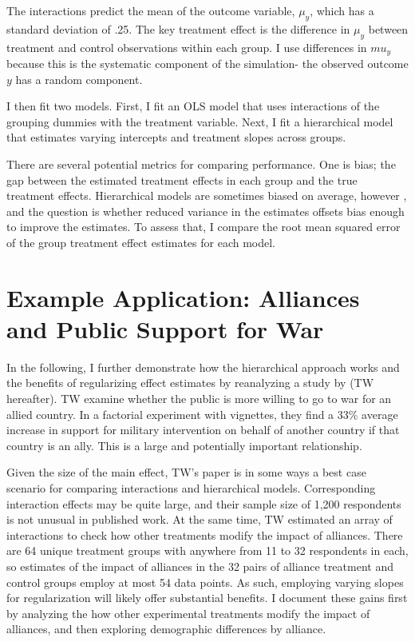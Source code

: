 \documentclass[12pt]{article}
\begin{document}
The interactions predict the mean of the outcome variable, $\mu_y$, which has a standard deviation of .25. 
The key treatment effect is the difference in $\mu_y$ between treatment and control observations within each group. 
I use differences in $mu_y$ because this is the systematic component of the simulation- the observed outcome $y$ has a random component. 


I then fit two models. 
First, I fit an OLS model that uses interactions of the grouping dummies with the treatment variable.
Next, I fit a hierarchical model that estimates varying intercepts and treatment slopes across groups.


There are several potential metrics for comparing performance. 
One is bias; the gap between the estimated treatment effects in each group and the true treatment effects. 
Hierarchical models are sometimes biased on average, however \citep{CliffordRainey2024}, and the question is whether reduced variance in the estimates offsets bias enough to improve the estimates.
To assess that, I compare the root mean squared error of the group treatment effect estimates for each model. 




\section{Example Application: Alliances and Public Support for War} 


In the following, I further demonstrate how the hierarchical approach works and the benefits of regularizing effect estimates by reanalyzing a study by \citet{TomzWeeks2021} (TW hereafter). 
TW examine whether the public is more willing to go to war for an allied country.
In a factorial experiment with vignettes, they find a 33\% average increase in support for military intervention on behalf of another country if that country is an ally. 
This is a large and potentially important relationship. 


Given the size of the main effect, TW's paper is in some ways a best case scenario for comparing interactions and hierarchical models. 
Corresponding interaction effects may be quite large, and their sample size of 1,200 respondents is not unusual in published work. 
At the same time, TW estimated an array of interactions to check how other treatments modify the impact of alliances.
There are 64 unique treatment groups with anywhere from 11 to 32 respondents in each, so estimates of the impact of alliances in the 32 pairs of alliance treatment and control groups employ at most 54 data points. 
As such, employing varying slopes for regularization will likely offer substantial benefits. 
I document these gains first by analyzing the how other experimental treatments modify the impact of alliances, and then exploring demographic differences by alliance. 
\end{document}

